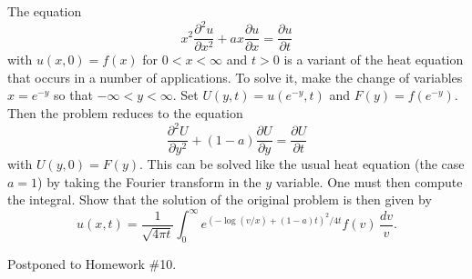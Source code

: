 \documentclass[12 pt, letterpaper]{hmcpset}
\begin{document}
\pagebreak

\begin{problem}[S \& S \S 5.6 \#1]
	The equation
	\[
		x^{2} \frac{\partial^{2} u}{\partial x^{2}} + a x \frac{\partial u}{\partial x} = \frac{\partial u}{\partial t}
	\]
	with $u(x, 0) = f(x)$ for $0 < x < \infty$ and $t > 0$ is a variant of the heat equation that occurs in a number of applications. To solve it, make the change of variables $x = e^{-y}$ so that $-\infty < y < \infty$. Set $U(y, t) = u(e^{-y}, t)$ and $F(y) = f(e^{-y})$. Then the problem reduces to the equation
	\[
		\frac{\partial^{2} U}{\partial y^{2}} + (1 - a) \frac{\partial U}{\partial y} = \frac{\partial U}{\partial t}
	\]
	with $U(y, 0) = F(y)$. This can be solved like the usual heat equation (the case $a = 1$) by taking the Fourier transform in the $y$ variable. One must then compute the integral.  Show that the solution of the original problem is then given by
	\[
		u(x, t) = \frac{1}{\sqrt{4 \pi t}} \int_{0}^{\infty} e^{(- \log(v / x) + (1 - a) t)^{2}/4t} {f(v)} \, \frac{dv}{v}. 
	\]
\end{problem}

\begin{solution}
	Postponed to Homework \#10.
\end{solution}
\end{document}
